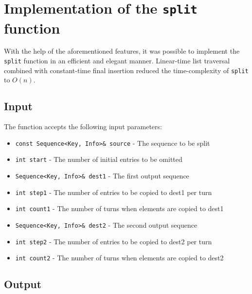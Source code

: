 ﻿\documentclass{article}
\begin{document}
\section{Implementation of the {\tt split} function}

With the help of the aforementioned features, it was possible to implement the
{\tt split} function in an efficient and elegant manner. Linear-time list
traversal combined with constant-time final insertion reduced the
time-complexity of {\tt split} to $O(n)$.

\subsection{Input}

The function accepts the following input parameters:

\begin{itemize}
\item {\tt const Sequence<Key, Info>\& source} - The sequence to be split
\item {\tt int start} - The number of initial entries to be omitted
\item {\tt Sequence<Key, Info>\& dest1} - The first output sequence
\item {\tt int step1} - The number of entries to be copied to dest1 per turn
\item {\tt int count1} - The number of turns when elements are copied to dest1
\item {\tt Sequence<Key, Info>\& dest2} - The second output sequence
\item {\tt int step2} - The number of entries to be copied to dest2 per turn
\item {\tt int count2} - The number of turns when elements are copied to dest2
\end{itemize}

\subsection{Output}
\end{document}
